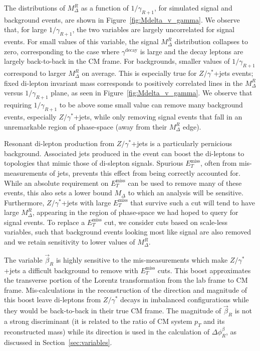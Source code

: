 The distributions of $M_{\Delta}^{R}$ as a function of $1/\gamma_{R+1}$, for simulated signal and background events, are shown in Figure~\ref{fig:Mdelta_v_gamma}. We observe that, for large $1/\gamma_{R+1}$, the two variables are largely uncorrelated for signal events. For small values of this variable, the signal $M_{\Delta}^{R}$ distribution collapses to zero, corresponding to the case where $\gamma^\text{decay}$ is large and the decay leptons are largely back-to-back in the CM frame. For backgrounds, smaller values of $1/\gamma_{R+1}$ correspond to larger $M_{\Delta}^{R}$ on average. This is especially true for $Z/\gamma^{*}$+jets events; fixed di-lepton invariant mass corresponds to positively correlated lines in the $M_{\Delta}^{R}$ versus $1/\gamma_{R+1}$ plane, as seen in Figure~\ref{fig:Mdelta_v_gamma}. We observe that requiring $1/\gamma_{R+1}$ to be above some small value can remove many background events, especially $Z/\gamma^{*}$+jets, while only removing signal events that fall in an unremarkable region of phase-space (away from their $M_{\Delta}^{R}$ edge).

Resonant di-lepton production from $Z/\gamma^{*}$+jets is a particularly pernicious background. Associated jets produced in the event can boost the di-leptons to topologies that mimic those of di-slepton signals. Spurious $E_{T}^\text{miss}$, often from mis-measurements of jets, prevents this effect from being correctly accounted for. While an absolute requirement on $E_{T}^\text{miss}$ can be used to remove many of these events, this also sets a lower bound $M_{\Delta}$ to which an analysis will be sensitive. Furthermore, $Z/\gamma^{*}$+jets with large $E_{T}^\text{miss}$ that survive such a cut will tend to have large $M_{\Delta}^{R}$, appearing in the region of phase-space we had hoped to query for signal events. To replace a $E_{T}^\text{miss}$ cut, we consider cuts based on scale-less variables, such that background events looking most like signal are also removed and we retain sensitivity to lower values of $M_{\Delta}^{R}$.

The variable $\vec{\beta}_{R}$ is highly sensitive to the mis-measurements which make $Z/\gamma^{*}$+jets a difficult background to remove with $E_T^\text{miss}$ cuts. This boost approximates the transverse portion of the Lorentz transformation from the lab frame to CM frame. Mis-calculations in the reconstruction of the direction and magnitude of this boost leave di-leptons from $Z/\gamma^{*}$ decays in imbalanced configurations while they would be back-to-back in their true CM frame. The magnitude of $\vec{\beta}_{R}$ is not a strong discriminant (it is related to the ratio of CM system $p_{T}$ and its reconstructed mass) while its direction is used in the calculation of $\Delta \phi_{R}^{\beta}$, as discussed in Section~\ref{sec:variables}. 

